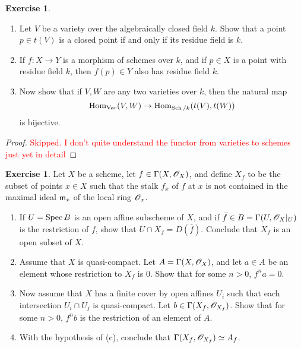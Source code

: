 \documentclass[]{pcmi}
\theoremstyle{plain}
\theoremstyle{definition}
\newtheorem{Exercise}[subsubsection]{Exercise}
\theoremstyle{remark}
\begin{document}
\begin{Exercise}
    \phantom{h}
    \begin{enumerate}[label = (\alph*)]
        \item Let $V$ be a variety over the algebraically closed field $k$. Show that a point $p \in t(V)$ is a closed point if and only if its residue field is $k$. 
        \item If $f : X \to Y$ is a morphism of schemes over $k$, and if $p \in X$ is a point with residue field $k$, then $f(p) \in Y$ also has residue field $k$. 
        \item Now show that if $V, W$ are any two varieties over $k$, then the natural map 
        \[
            \operatorname{Hom}_{\operatorname{Var}}(V, W) \to \operatorname{Hom}_{\operatorname{Sch} / k} (t(V), t(W))
        \]
        is bijective. 
    \end{enumerate}
\end{Exercise}
\begin{proof}
    \textcolor{red}{Skipped. I don't quite understand the functor from varieties to schemes just yet in detail}
\end{proof}
\begin{Exercise}
    Let $X$ be a scheme, let $f \in \Gamma(X, \mathscr{O}_X)$, and define $X_f$ to be the subset of points $x \in X$ such that the stalk $f_x$ of $f$ at $x$ is not contained in the maximal ideal $\mathsf{m}_x$ of the local ring $\mathscr{O}_x$. 
    \begin{enumerate}[label = (\alph*)]
        \item If $U = \operatorname{Spec} B$ is an open affine subscheme of $X$, and if $\bar{f} \in B = \Gamma(U, \mathscr{O}_X|_U)$ is the restriction of $f$, show that $U \cap X_f = D(\bar{f})$. Conclude that $X_f$ is an open subset of $X$. 
        \item Assume that $X$ is quasi-compact. Let $A = \Gamma(X, \mathscr{O}_X)$, and let $a \in A$ be an element whose restriction to $X_f$ is $0$. Show that for some $n > 0$, $f^n a = 0$. 
        \item Now assume that $X$ has a finite cover by open affines $U_i$ such that each intersection $U_i \cap U_j$ is quasi-compact. Let $b \in \Gamma(X_f, \mathscr{O}_{X_f})$. Show that for some $n > 0$, $f^nb$ is the restriction of an element of $A$. 

        \item With the hypothesis of (c), conclude that $\Gamma(X_f, \mathscr{O}_{X_f}) \simeq A_f$. 
    \end{enumerate}
\end{Exercise}
\end{document}
